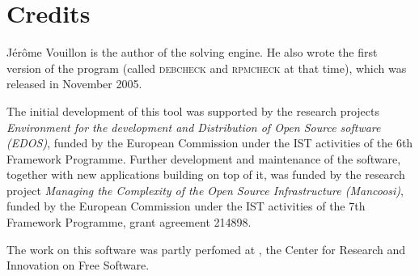
\section{Credits}
\label{sec:credits}

Jérôme Vouillon is the author of the solving engine. He also wrote the
first version of the program (called \textsc{debcheck} and
\textsc{rpmcheck} at that time), which was released in November 2005.

The initial development of this tool was supported by the research
projects \emph{Environment for the development and Distribution of
  Open Source software (EDOS)}, funded by the European Commission
under the IST activities of the 6th Framework Programme. Further
development and maintenance of the software, together with new
applications building on top of it, was funded by the research project
\emph{Managing the Complexity of the Open Source Infrastructure
  (Mancoosi)}, funded by the European Commission under the IST
activities of the 7th Framework Programme, grant agreement 214898.

The work on this software was partly perfomed at
, the Center for Research and
Innovation on Free Software.

